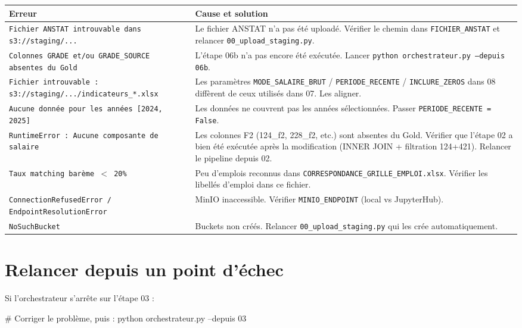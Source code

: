 \documentclass[12pt,a4paper,french]{report}
\begin{document}
\begin{tabularx}{\textwidth}{lX}
  \toprule
  \textbf{Erreur} & \textbf{Cause et solution} \\
  \midrule
  \texttt{Fichier ANSTAT introuvable dans s3://staging/...} &
    Le fichier ANSTAT n'a pas été uploadé. Vérifier le chemin dans
    \texttt{FICHIER\_ANSTAT} et relancer \texttt{00\_upload\_staging.py}. \\
  \texttt{Colonnes GRADE et/ou GRADE\_SOURCE absentes du Gold} &
    L'étape 06b n'a pas encore été exécutée.
    Lancer \texttt{python orchestrateur.py --depuis 06b}. \\
  \texttt{Fichier introuvable : s3://staging/.../indicateurs\_*.xlsx} &
    Les paramètres \texttt{MODE\_SALAIRE\_BRUT} / \texttt{PERIODE\_RECENTE} /
    \texttt{INCLURE\_ZEROS} dans 08 diffèrent de ceux utilisés dans 07.
    Les aligner. \\
  \texttt{Aucune donnée pour les années [2024, 2025]} &
    Les données ne couvrent pas les années sélectionnées.
    Passer \texttt{PERIODE\_RECENTE = False}. \\
  \texttt{RuntimeError : Aucune composante de salaire} &
    Les colonnes F2 (124\_f2, 228\_f2, etc.) sont absentes du Gold.
    Vérifier que l'étape 02 a bien été exécutée après la modification
    (INNER JOIN + filtration 124+421). Relancer le pipeline depuis 02. \\
  \texttt{Taux matching barème $<$ 20\%} &
    Peu d'emplois reconnus dans \texttt{CORRESPONDANCE\_GRILLE\_EMPLOI.xlsx}.
    Vérifier les libellés d'emploi dans ce fichier. \\
  \texttt{ConnectionRefusedError / EndpointResolutionError} &
    MinIO inaccessible. Vérifier \texttt{MINIO\_ENDPOINT} (local vs JupyterHub). \\
  \texttt{NoSuchBucket} &
    Buckets non créés. Relancer \texttt{00\_upload\_staging.py} qui les crée
    automatiquement. \\
  \bottomrule
\end{tabularx}

\section{Relancer depuis un point d'échec}

Si l'orchestrateur s'arrête sur l'étape 03 :
\begin{codebox}[]
# Corriger le problème, puis :
python orchestrateur.py --depuis 03
\end{codebox}
\end{document}
